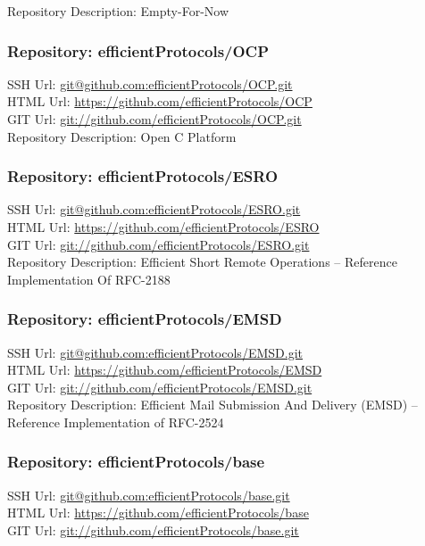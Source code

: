 Repository Description: Empty-For-Now

\subsubsection{Repository: efficientProtocols/OCP}

SSH Url:  \url{git@github.com:efficientProtocols/OCP.git}\\
HTML Url: \url{https://github.com/efficientProtocols/OCP}\\
GIT Url:  \url{git://github.com/efficientProtocols/OCP.git}\\


Repository Description: Open C Platform

\subsubsection{Repository: efficientProtocols/ESRO}

SSH Url:  \url{git@github.com:efficientProtocols/ESRO.git}\\
HTML Url: \url{https://github.com/efficientProtocols/ESRO}\\
GIT Url:  \url{git://github.com/efficientProtocols/ESRO.git}\\


Repository Description: Efficient Short Remote Operations -- Reference Implementation Of RFC-2188

\subsubsection{Repository: efficientProtocols/EMSD}

SSH Url:  \url{git@github.com:efficientProtocols/EMSD.git}\\
HTML Url: \url{https://github.com/efficientProtocols/EMSD}\\
GIT Url:  \url{git://github.com/efficientProtocols/EMSD.git}\\


Repository Description: Efficient Mail Submission And Delivery  (EMSD) -- Reference Implementation of RFC-2524

\subsubsection{Repository: efficientProtocols/base}

SSH Url:  \url{git@github.com:efficientProtocols/base.git}\\
HTML Url: \url{https://github.com/efficientProtocols/base}\\
GIT Url:  \url{git://github.com/efficientProtocols/base.git}\\


